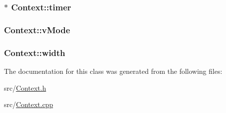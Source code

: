 \hypertarget{class_context_a50debe673def575a9eeb00d8102ebbe8}{
\subsubsection[{timer}]{$\ast$ Context\-::timer}}\label{class_context_a50debe673def575a9eeb00d8102ebbe8}
\hypertarget{class_context_a9a49b761af0f0dc8cab9121adfa6175f}{
\subsubsection[{v\-Mode}]{ Context\-::v\-Mode}}\label{class_context_a9a49b761af0f0dc8cab9121adfa6175f}
\hypertarget{class_context_a6d0fc950bf72cf1e1360d83c744199fb}{
\subsubsection[{width}]{ Context\-::width}}\label{class_context_a6d0fc950bf72cf1e1360d83c744199fb}


The documentation for this class was generated from the following files\-:\begin{DoxyCompactItemize}
\item 
src/\hyperlink{_context_8h}{Context.\-h}\item 
src/\hyperlink{_context_8cpp}{Context.\-cpp}\end{DoxyCompactItemize}
